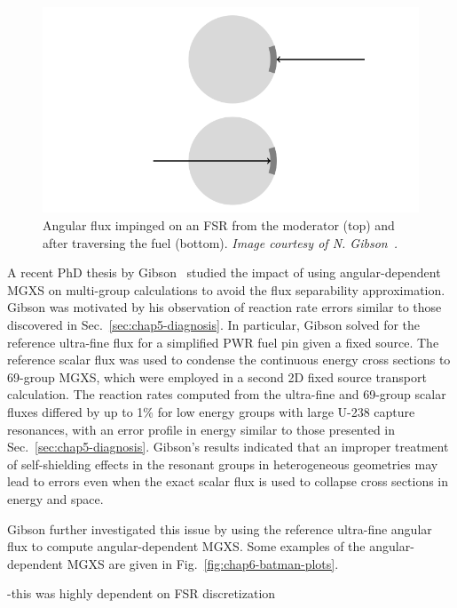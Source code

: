 \begin{figure}[h]
  \centering
  \includegraphics[width=\linewidth]{figures/sph/incoming-outgoing}
  \caption{}
\caption[Angular flux impinged on an FSR]{Angular flux impinged on an FSR from the moderator (top) and after traversing the fuel (bottom). \textit{Image courtesy of N. Gibson~\cite{gibson2016thesis}.}}
\label{fig:chap6-incoming-outgoing}
\end{figure}

A recent PhD thesis by Gibson~\cite{gibson2016thesis} studied the impact of using angular-dependent \ac{MGXS} on multi-group calculations to avoid the flux separability approximation. Gibson was motivated by his observation of reaction rate errors similar to those discovered in Sec.~\ref{sec:chap5-diagnosis}. In particular, Gibson solved for the reference ultra-fine flux for a simplified \ac{PWR} fuel pin given a fixed source. The reference scalar flux was used to condense the continuous energy cross sections to 69-group \ac{MGXS}, which were employed in a second 2D fixed source transport calculation. The reaction rates computed from the ultra-fine and 69-group scalar fluxes differed by up to 1\% for low energy groups with large U-238 capture resonances, with an error profile in energy similar to those presented in Sec.~\ref{sec:chap5-diagnosis}. Gibson's results indicated that an improper treatment of self-shielding effects in the resonant groups in heterogeneous geometries may lead to errors even when the exact scalar flux is used to collapse cross sections in energy and space.

Gibson further investigated this issue by using the reference ultra-fine angular flux to compute angular-dependent \ac{MGXS}. Some examples of the angular-dependent \ac{MGXS} are given in Fig.~\ref{fig:chap6-batman-plots}.

-this was highly dependent on FSR discretization


